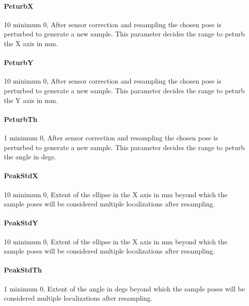 \documentclass{article}
\begin{document}
\paragraph{PeturbX}\label{PeturbX} 10                minimum 0,  After sensor correction and resampling
                          the chosen pose is perturbed to generate a new
                          sample. This parameter decides the range to peturb
                          the X axis in mm.

\paragraph{PeturbY}\label{PeturbY} 10                minimum 0,  After sensor correction and resampling
                          the chosen pose is perturbed to generate a new
                          sample. This parameter decides the range to peturb
                          the Y axis in mm.

\paragraph{PeturbTh}\label{PeturbTh} 1                minimum 0,  After sensor correction and resampling
                          the chosen pose is perturbed to generate a new
                          sample. This parameter decides the range to peturb
                          the angle in degs.

\paragraph{PeakStdX} 10               minimum 0,  Extent of the ellipse in the X axis in
                          mm beyond which the sample poses will be considered
                          multiple localizations after resampling.

\paragraph{PeakStdY} 10               minimum 0,  Extent of the ellipse in the X axis in
                          mm beyond which the sample poses will be considered
                          multiple localizations after resampling.

\paragraph{PeakStdTh} 1               minimum 0,  Extent of the angle in degs beyond which
                          the sample poses will be considered multiple
                          localizations after resampling.
\end{document}
